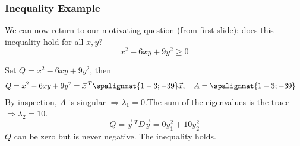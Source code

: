\begin{frame}\frametitle{Inequality Example}

    We can now return to our motivating question (from first slide): does this inequality hold for all $x,y$?  
    \begin{equation*}
        x^2 - 6 xy + 9 y ^2 \geq 0
    \end{equation*}
    \pause 
    
    Set $Q = x^2 - 6 xy + 9 y ^2$, then 
    \pause 
    \begin{align*}
        Q &= x^2 - 6 xy + 9 y ^2 = \vec x\, ^T \spalignmat{1 -3;-3 9}\vec x , \quad A = \spalignmat{1 -3;-3 9} 
    \end{align*}
    \pause 
    By inspection, $A$ is singular $ \Rightarrow \lambda_1 = 0$.\pause The sum of the eigenvalues is the trace $\Rightarrow \lambda_2 = 10$. \pause $$Q = \vec y \, ^T D \vec y = 0y_1^2 + 10 y_2^2$$
    \pause $Q$ can be zero but is never negative. The inequality holds. 
\end{frame}








    


